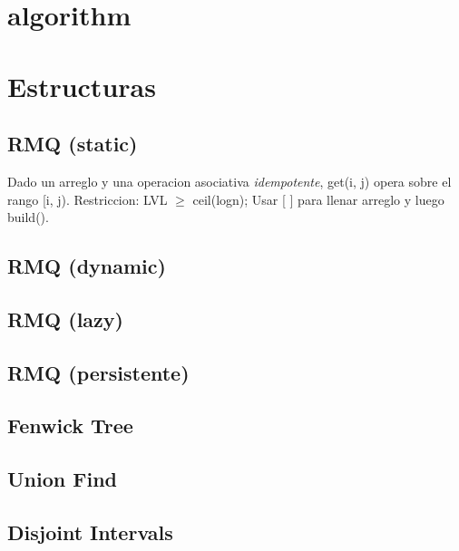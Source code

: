 

\def\title{Caloventor en Dos - Universidad Nacional de Rosario}
\tableofcontents\newpage
 
\section{algorithm}%



\section{Estructuras}%
\subsection{RMQ (static)}
Dado un arreglo y una operacion asociativa \emph{idempotente}, get(i, j) opera sobre el rango [i, j). Restriccion: LVL $\ge$ ceil(logn); Usar [ ] para llenar arreglo y luego build().
\subsection{RMQ (dynamic)}
\subsection{RMQ (lazy)}
\subsection{RMQ (persistente)}
\subsection{Fenwick Tree}
\subsection{Union Find}
\subsection{Disjoint Intervals}
